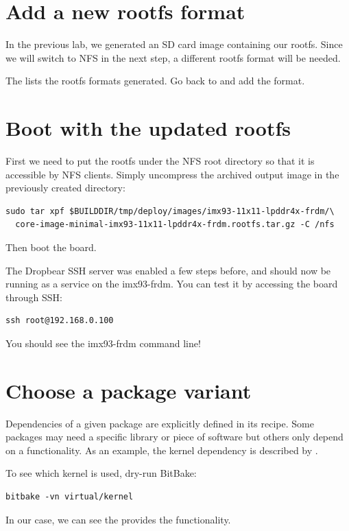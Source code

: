 \section{Add a new rootfs format}

In the previous lab, we generated an SD card image containing our rootfs.
Since we will switch to NFS in the next step, a different rootfs format will be
needed.

The  lists the rootfs formats generated. Go
back to  and add the  format.

\section{Boot with the updated rootfs}

First we need to put the rootfs under the NFS root directory so that it is
accessible by NFS clients. Simply uncompress the archived output image in the
previously created  directory:
\begin{verbatim}
sudo tar xpf $BUILDDIR/tmp/deploy/images/imx93-11x11-lpddr4x-frdm/\
  core-image-minimal-imx93-11x11-lpddr4x-frdm.rootfs.tar.gz -C /nfs
\end{verbatim}

Then boot the board.

The Dropbear SSH server was enabled a few steps before, and should now be
running as a service on the imx93-frdm. You can test it by accessing the
board through SSH:
\begin{verbatim}
ssh root@192.168.0.100
\end{verbatim}

You should see the imx93-frdm command line!

\section{Choose a package variant}

Dependencies of a given package are explicitly defined in its recipe.
Some packages may need a specific library or piece of software but
others only depend on a functionality. As an example, the kernel
dependency is described by \code{virtual/kernel}.

To see which kernel is used, dry-run BitBake:
\begin{verbatim}
bitbake -vn virtual/kernel
\end{verbatim}

In our case, we can see the  provides the
 functionality.

